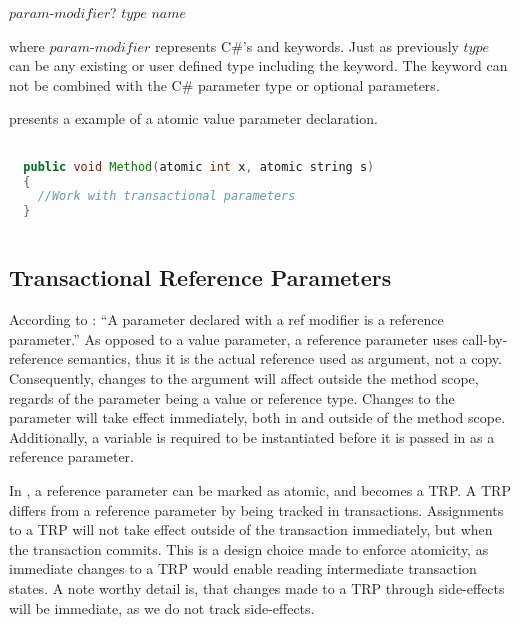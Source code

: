  $param$-$modifier$? $type$ $name$

where $param$-$modifier$ represents C\#'s  and  keywords. Just as previously $type$ can be any existing or user defined type including the  keyword. The  keyword can not be combined with the C\#  parameter type or optional parameters\cite[p. 42]{sestoft2011c}.

 presents a example of a atomic value parameter declaration.

\begin{lstlisting}[label=lst:design_value_parameter,
  caption={Value Parameter},
  language=Java,  
  showspaces=false,
  showtabs=false,
  breaklines=true,
  showstringspaces=false,
  breakatwhitespace=true,
  commentstyle=\color{greencomments},
  keywordstyle=\color{bluekeywords},
  stringstyle=\color{redstrings},
  morekeywords={atomic, retry, orElse, var, get, set}]  % Start your code-block

  public void Method(atomic int x, atomic string s)
  {
  	//Work with transactional parameters
  }
    
\end{lstlisting}



\subsection{Transactional Reference Parameters}
According to \cite[p. 97]{csharp2013specificaiton}: ``A parameter declared with a ref modifier is a reference parameter.'' As opposed to a value parameter, a reference parameter uses call-by-reference semantics, thus it is the actual reference used as argument, not a copy. Consequently, changes to the argument will affect outside the method scope, regards of the parameter being a value or reference type. Changes to the parameter will take effect immediately, both in and outside of the method scope\cite[p. 42]{sestoft2011c}. Additionally, a variable is required to be instantiated before it is passed in as a reference parameter\cite[p. 97]{csharp2013specificaiton}.

In \stmnamesp, a reference parameter can be marked as atomic, and becomes a \ac{TRP}. A \ac{TRP} differs from a reference parameter by being tracked in transactions. Assignments to a \ac{TRP} will not take effect outside of the transaction immediately, but when the transaction commits. This is a design choice made to enforce atomicity, as immediate changes to a \ac{TRP} would enable reading intermediate transaction states. A note worthy detail is, that changes made to a \ac{TRP} through side-effects will be immediate, as we do not track side-effects.

